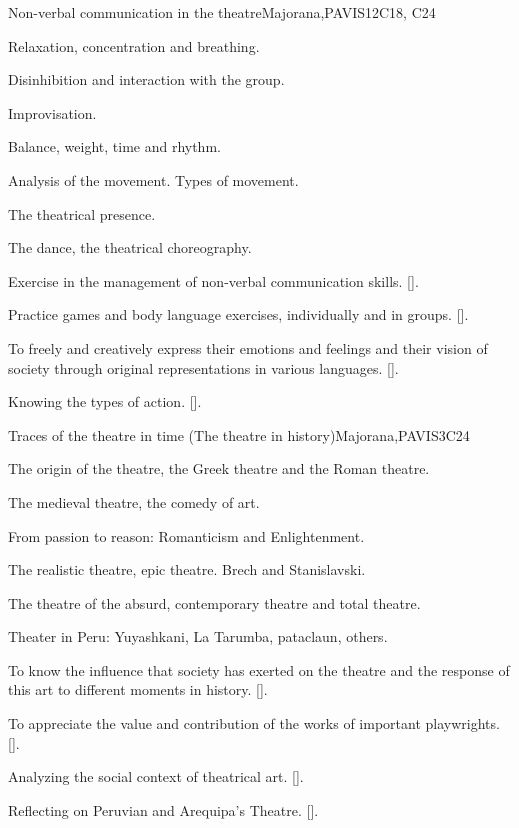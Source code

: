 \begin{syllabus}
\begin{unit}{}{Non-verbal communication in the theatre}{Majorana,PAVIS}{12}{C18, C24}
\begin{topics}
	\item Relaxation, concentration and breathing.
	\item Disinhibition and interaction with the group.
	\item Improvisation.
	\item Balance, weight, time and rhythm.
	\item Analysis of the movement. Types of movement.
	\item The theatrical presence.
	\item The dance, the theatrical choreography.

\end{topics}
\begin{learningoutcomes}
	\item Exercise in the management of non-verbal communication skills. [\Usage].
	\item Practice games and body language exercises, individually and in groups. [\Usage].
	\item To freely and creatively express their emotions and feelings and their vision of society through original representations in various languages. [\Usage].
	\item Knowing the types of action. [\Usage].
\end{learningoutcomes}
\end{unit}

\begin{unit}{}{Traces of the theatre in time (The theatre in history)}{Majorana,PAVIS}{3}{C24}
\begin{topics}
	\item The origin of the theatre, the Greek theatre and the Roman theatre.
	\item The medieval theatre, the comedy of art.
	\item From passion to reason: Romanticism and Enlightenment.
	\item The realistic theatre, epic theatre. Brech and Stanislavski.
	\item The theatre of the absurd, contemporary theatre and total theatre.
	\item Theater in Peru: Yuyashkani, La Tarumba, pataclaun, others.
\end{topics}
\begin{learningoutcomes}
	\item To know the influence that society has exerted on the theatre and the response of this art to different moments in history. [\Usage].
	\item To appreciate the value and contribution of the works of important playwrights. [\Usage].
	\item Analyzing the social context of theatrical art. [\Usage].
	\item Reflecting on Peruvian and Arequipa's Theatre. [\Usage].
\end{learningoutcomes}
\end{unit}


\end{syllabus}

